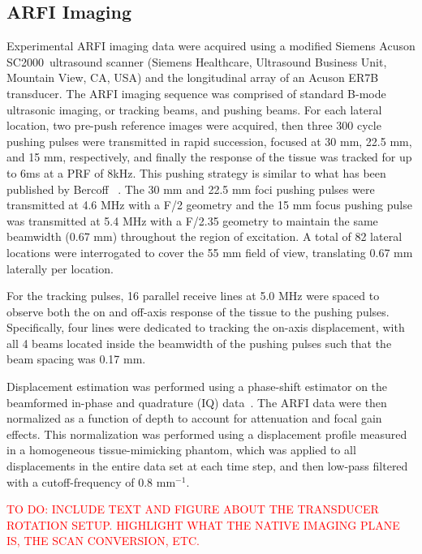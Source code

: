 \subsection{ARFI Imaging}
Experimental ARFI imaging data were acquired using a modified Siemens Acuson
SC2000\texttrademark~ultrasound scanner (Siemens Healthcare, Ultrasound Business Unit,
Mountain View, CA, USA) and the longitudinal array of an Acuson ER7B
transducer.  The ARFI imaging sequence was comprised of
standard B-mode ultrasonic imaging, or tracking beams, and pushing beams. For
each lateral location, two pre-push reference images were acquired, then three
300 cycle pushing pulses were transmitted in rapid succession, focused at 30
mm, 22.5 mm, and 15 mm, respectively, and finally the response of the tissue
was tracked for up to 6ms at a PRF of 8kHz. This pushing strategy is similar to
what has been published by Bercoff \etal~\cite{Bercoff2004}. The 30 mm and 22.5
mm foci pushing pulses were transmitted at 4.6 MHz with a F/2 geometry and the
15 mm focus pushing pulse was transmitted at 5.4 MHz with a F/2.35 geometry to
maintain the same beamwidth (0.67 mm) throughout the region of excitation. A
total of 82 lateral locations were interrogated to cover the 55 mm field of
view, translating 0.67 mm laterally per location.

For the tracking pulses, 16 parallel receive lines at 5.0 MHz were spaced to
observe both the on and off-axis response of the tissue to the pushing pulses.
Specifically, four lines were dedicated to tracking the on-axis displacement,
with all 4 beams located inside the beamwidth of the pushing pulses such that
the beam spacing was 0.17 mm. 

Displacement estimation was performed using a phase-shift estimator on the
beamformed in-phase and quadrature (IQ) data~\cite{Loupas95,pinton06}. The ARFI
data were then normalized as a function of depth to account for attenuation and
focal gain effects.  This normalization was performed using a displacement
profile measured in a homogeneous tissue-mimicking phantom, which was applied
to all displacements in the entire data set at each time step, and then
low-pass filtered with a cutoff-frequency of 0.8 mm$^{-1}$.

\textcolor{red}{TO DO: INCLUDE TEXT AND FIGURE ABOUT THE TRANSDUCER ROTATION SETUP.  HIGHLIGHT WHAT THE NATIVE IMAGING PLANE IS, THE SCAN CONVERSION, ETC.}
